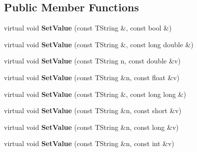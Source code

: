 \subsection*{Public Member Functions}
\begin{DoxyCompactItemize}
\item 
\hypertarget{class_h_a_l_1_1_analysis_data_a3870a72f6b39f3b4509b2498d285d94a}{virtual void {\bfseries Set\+Value} (const T\+String \&, const bool \&)}\label{class_h_a_l_1_1_analysis_data_a3870a72f6b39f3b4509b2498d285d94a}

\item 
\hypertarget{class_h_a_l_1_1_analysis_data_af74aff588a73f1c4d0a5e5ecbad14efb}{virtual void {\bfseries Set\+Value} (const T\+String \&, const long double \&)}\label{class_h_a_l_1_1_analysis_data_af74aff588a73f1c4d0a5e5ecbad14efb}

\item 
\hypertarget{class_h_a_l_1_1_analysis_data_ae88cc39a2594cf0bb969e3626cf17412}{virtual void {\bfseries Set\+Value} (const T\+String n, const double \&v)}\label{class_h_a_l_1_1_analysis_data_ae88cc39a2594cf0bb969e3626cf17412}

\item 
\hypertarget{class_h_a_l_1_1_analysis_data_a3953675a3b647f8c87eb214e25940d77}{virtual void {\bfseries Set\+Value} (const T\+String \&n, const float \&v)}\label{class_h_a_l_1_1_analysis_data_a3953675a3b647f8c87eb214e25940d77}

\item 
\hypertarget{class_h_a_l_1_1_analysis_data_ad18a729c4979bacc30d32e0802520236}{virtual void {\bfseries Set\+Value} (const T\+String \&, const long long \&)}\label{class_h_a_l_1_1_analysis_data_ad18a729c4979bacc30d32e0802520236}

\item 
\hypertarget{class_h_a_l_1_1_analysis_data_a2d3510dc4ee329387906e8738061b6b4}{virtual void {\bfseries Set\+Value} (const T\+String \&n, const short \&v)}\label{class_h_a_l_1_1_analysis_data_a2d3510dc4ee329387906e8738061b6b4}

\item 
\hypertarget{class_h_a_l_1_1_analysis_data_af8f2df54ad897dce65aa6224cac0af7c}{virtual void {\bfseries Set\+Value} (const T\+String \&n, const long \&v)}\label{class_h_a_l_1_1_analysis_data_af8f2df54ad897dce65aa6224cac0af7c}

\item 
\hypertarget{class_h_a_l_1_1_analysis_data_a697cb757197048cbcc5716bb32499c60}{virtual void {\bfseries Set\+Value} (const T\+String \&n, const int \&v)}\label{class_h_a_l_1_1_analysis_data_a697cb757197048cbcc5716bb32499c60}


\end{DoxyCompactItemize}
